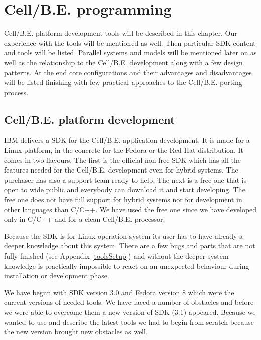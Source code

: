 \chapter {\mbox{Cell/B.E.} programming}
\par
\mbox{Cell/B.E.} platform development tools will be described in this chapter.
Our experience with the tools will be mentioned as well.
Then particular SDK content and tools will be listed.
Parallel systems and models will be mentioned later on as well as the relationship to the \mbox{Cell/B.E.} development along with a few design patterns.
At the end core configurations and their advantages and disadvantages will be listed finishing with few practical approaches to the \mbox{Cell/B.E.} porting process.

\section{\mbox{Cell/B.E.} platform development}
\par
IBM delivers a SDK for the \mbox{Cell/B.E.} application development.
It is made for a Linux platform, in the concrete for the Fedora or the Red Hat distribution.
It comes in two flavours.
The first is the official non free SDK which has all the features needed for the \mbox{Cell/B.E.} development even for hybrid systems.
The purchaser has also a support team ready to help.
The next is a free one that is open to wide public and everybody can download it and start developing.
The free one does not have full support for hybrid systems nor for development in other languages than C/C++.
We have used the free one since we have developed only in C/C++ and for a clean \mbox{Cell/B.E.} processor.

\par
Because the SDK is for Linux operation system its user has to have already a deeper knowledge about this system.
There are a few bugs and parts that are not fully finished (see Appendix \ref{toolsSetup}) and without the deeper system knowledge is practically impossible to react on an unexpected behaviour during installation or development phase.

\par
We have begun with SDK version 3.0 and Fedora version 8 which were the current versions of needed tools.
We have faced a number of obstacles and before we were able to overcome them a new version of SDK (3.1) appeared.
Because we wanted to use and describe the latest tools we had to begin from scratch because the new version brought new obstacles as well.

